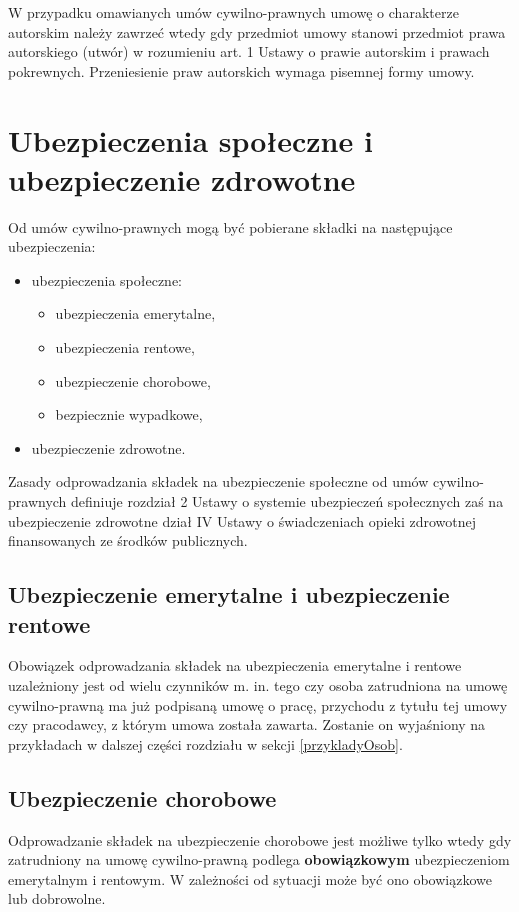 W przypadku omawianych umów cywilno-prawnych umowę o charakterze autorskim należy zawrzeć wtedy gdy przedmiot umowy stanowi przedmiot prawa autorskiego (utwór) w rozumieniu art. 1 Ustawy o prawie autorskim i prawach pokrewnych\cite{ustawaOPrawieAutorskim}. Przeniesienie praw autorskich wymaga pisemnej formy umowy.

\section[Ubezpieczenia społeczne i ubezpieczenie zdrowotne][Ubezpieczenia społeczne i ubezpieczenie zdrowotne]{Ubezpieczenia społeczne i ubezpieczenie zdrowotne}
Od umów cywilno-prawnych mogą być pobierane składki na następujące ubezpieczenia:
\begin{itemize}
	\item ubezpieczenia społeczne:
	\begin{itemize}
		\item ubezpieczenia emerytalne,
		\item ubezpieczenia rentowe,
		\item ubezpieczenie chorobowe,
		\item bezpiecznie wypadkowe,
	\end{itemize}
	\item ubezpieczenie zdrowotne.
\end{itemize}
Zasady odprowadzania składek na ubezpieczenie społeczne od umów cywilno-prawnych definiuje rozdział 2 Ustawy o systemie ubezpieczeń społecznych\cite{ustawaOSystemieUbezpieczen} zaś na ubezpieczenie zdrowotne dział IV Ustawy o świadczeniach opieki zdrowotnej finansowanych ze środków publicznych\cite{ustawaOSwiadczeniachOpieki}.

\subsection[Ubezpieczenie emerytalne i ubezpieczenie rentowe][Ubezpieczenie emerytalne i ubezpieczenie rentowe]{Ubezpieczenie emerytalne i ubezpieczenie rentowe}
Obowiązek odprowadzania składek na ubezpieczenia emerytalne i rentowe uzależniony jest od wielu czynników m. in. tego czy osoba zatrudniona na umowę cywilno-prawną ma już podpisaną umowę o pracę, przychodu z tytułu tej umowy czy pracodawcy, z którym umowa została zawarta. Zostanie on wyjaśniony na przykładach w dalszej części rozdziału w sekcji \ref{przykladyOsob}.

\subsection[Ubezpieczenie chorobowe][Ubezpieczenie chorobowe]{Ubezpieczenie chorobowe}
Odprowadzanie składek na ubezpieczenie chorobowe jest możliwe tylko wtedy gdy zatrudniony na umowę cywilno-prawną podlega \textbf{obowiązkowym} ubezpieczeniom emerytalnym i rentowym. W zależności od sytuacji może być ono obowiązkowe lub dobrowolne.

